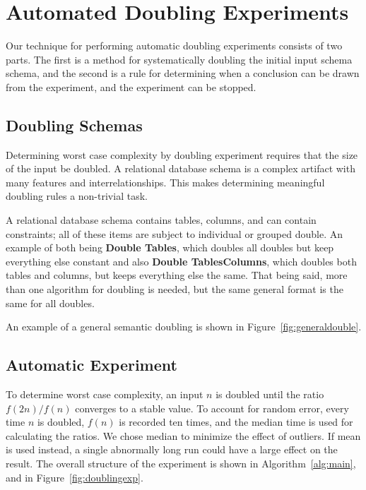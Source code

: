 \section{Automated Doubling Experiments}
  \label{sec:technique}

  Our technique for performing automatic doubling experiments consists
  of two parts.  The first is a method for systematically doubling 
  the initial input schema schema, and the second is a rule for determining
  when a conclusion can be drawn from the experiment, and the experiment can be stopped. 

  \subsection{Doubling Schemas}
  \label{subsec:doubling}

  Determining worst case complexity by doubling experiment requires that
  the size of the input be doubled. A relational database
  schema is a complex artifact with many features and interrelationships. 
  This makes determining meaningful doubling rules a non-trivial task.


  A relational database schema contains tables, columns, and can contain constraints; 
  all of these items are subject to individual or grouped double. An example of
  both being \textbf{Double Tables}, which doubles all doubles but keep
  everything else constant and also \textbf{Double TablesColumns}, which
  doubles both tables and columns, but keeps everything else the same. That 
  being said, more than one algorithm for doubling is needed, but the same 
  general format is the same for all doubles.

  An example of a general semantic doubling is shown in
  Figure~\ref{fig:generaldouble}.

  \subsection{Automatic Experiment}
  \label{subsec:experiment}

  To determine worst case complexity, an input $n$ is doubled until the 
  ratio $f(2n) / f(n)$ converges to a stable value. To account for random
  error, every time $n$ is doubled, $f(n)$ is recorded ten times, and the
  median time is used for calculating the ratios.  We chose
  median to minimize the effect of outliers. If mean is used instead, a
  single abnormally long run could have a large effect on the result. The overall 
  structure of the experiment is shown in Algorithm~\ref{alg:main}, and in
  Figure~\ref{fig:doublingexp}.

